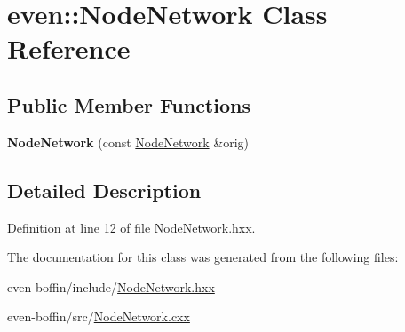 \hypertarget{classeven_1_1_node_network}{}\section{even\+:\+:Node\+Network Class Reference}
\label{classeven_1_1_node_network}
\subsection*{Public Member Functions}
\begin{DoxyCompactItemize}
\item 
\mbox{\label{classeven_1_1_node_network_a67b88bba329ef88b8372b66c417f64f6}} 
{\bfseries Node\+Network} (const \mbox{\hyperlink{classeven_1_1_node_network}{Node\+Network}} \&orig)
\end{DoxyCompactItemize}


\subsection{Detailed Description}


Definition at line 12 of file Node\+Network.\+hxx.



The documentation for this class was generated from the following files\+:\begin{DoxyCompactItemize}
\item 
even-\/boffin/include/\mbox{\hyperlink{_node_network_8hxx}{Node\+Network.\+hxx}}\item 
even-\/boffin/src/\mbox{\hyperlink{_node_network_8cxx}{Node\+Network.\+cxx}}\end{DoxyCompactItemize}
